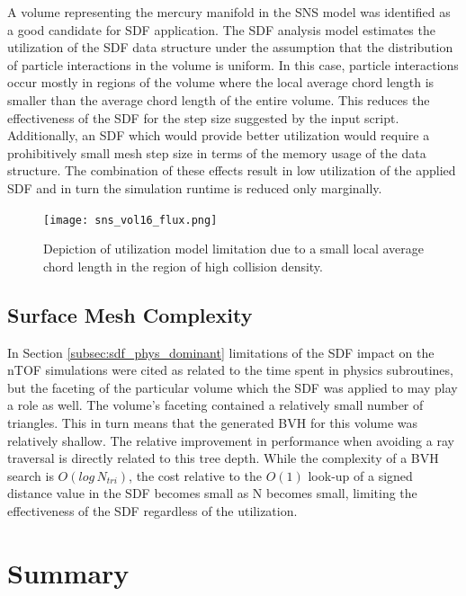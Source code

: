A volume representing the mercury manifold in the SNS model was identified as a
good candidate for SDF application. The SDF analysis model estimates the
utilization of the SDF data structure under the assumption that the distribution
of particle interactions in the volume is uniform. In this case, particle
interactions occur mostly in regions of the volume where the local average chord
length is smaller than the average chord length of the entire volume. This
reduces the effectiveness of the SDF for the step size suggested by the input
script. Additionally, an SDF which would provide better utilization would
require a prohibitively small mesh step size in terms of the memory usage of the
data structure. The combination of these effects result in low utilization of
the applied SDF and in turn the simulation runtime is reduced only marginally.

\begin{figure}
  \centering
  \texttt{[image: sns\_vol16\_flux.png]}
  \caption[Mesh tally results of the SNS model.]{Depiction of utilization model
    limitation due to a small local average chord length in the region of high
    collision density.}
  \label{fig:sns_low_util}
\end{figure}

\subsection{Surface Mesh Complexity}\label{subsec:sdf_tree_depth}

In Section \ref{subsec:sdf_phys_dominant} limitations of the SDF impact on the
nTOF simulations were cited as related to the time spent in physics subroutines,
but the faceting of the particular volume which the SDF was applied to may play
a role as well. The volume's faceting contained a relatively small number of
triangles. This in turn means that the generated BVH for this volume was
relatively shallow. The relative improvement in performance when avoiding a ray
traversal is directly related to this tree depth. While the complexity of a BVH
search is $O(log\, N_{tri})$, the cost relative to the $O(1)$ look-up of a signed
distance value in the SDF becomes small as N becomes small, limiting the
effectiveness of the SDF regardless of the utilization.

\section{Summary}

